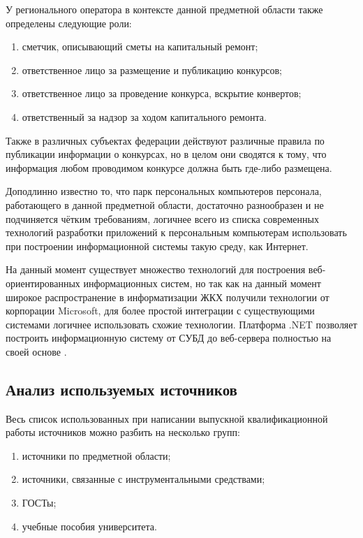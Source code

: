 У регионального оператора в контексте данной предметной области также определены следующие роли:

\begin{enumerate}
	\item сметчик, описывающий сметы на капитальный ремонт;
	\item ответственное лицо за размещение и публикацию конкурсов;
	\item ответственное лицо за проведение конкурса, вскрытие конвертов;
	\item ответственный за надзор за ходом капитального ремонта.
\end{enumerate}

Также в различных субъектах федерации действуют различные правила по публикации информации о конкурсах, но в целом они сводятся к тому, что информация любом проводимом конкурсе должна быть где-либо размещена.

Доподлинно известно то, что парк персональных компьютеров персонала, работающего в данной предметной области, достаточно разнообразен и не подчиняется чётким требованиям, логичнее всего из списка современных технологий разработки приложений к персональным компьютерам использовать при построении информационной системы такую среду, как Интернет.

На данный момент существует множество технологий для построения веб-ориентированных информационных систем, но так как на данный момент широкое распространение в информатизации ЖКХ получили технологии от корпорации Microsoft, для более простой интеграции с существующими системами логичнее использовать схожие технологии.
Платформа .NET позволяет построить информационную систему от СУБД до веб-сервера полностью на своей основе \cite{troelsen,flenov}.

\subsection*{Анализ используемых источников}

Весь список использованных при написании выпускной квалификационной работы источников можно разбить на несколько групп:

\begin{enumerate}
	\item источники по предметной области;
	\item источники, связанные с инструментальными средствами;
	\item ГОСТы;
	\item учебные пособия университета.
\end{enumerate}

